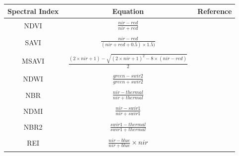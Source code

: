     \renewcommand{\arraystretch}{1.8}
    \begin{center}
    \small
    \begin{tabular}{ccc}
    \label{tab:spectral_indices}
    Spectral Index & Equation & Reference\\
    \hline
    NDVI &
    $\begin{aligned} %
    \frac{nir - red}{nir + red}
    \end{aligned}$ & \citep{tucker1979red}\\
    SAVI &
    $\begin{aligned} %
    \frac{nir - red}{(nir + red + 0.5) \times 1.5)}
    \end{aligned}$ & \citep{huete1988savi}\\
    MSAVI &
    $\begin{aligned} %
    \frac{(2 \times nir + 1) - \sqrt{(2 \times nir + 1)^{2} - 8 \times (nir - red)}}{2}
    \end{aligned}$ &  \citep{qi1994msavi}\\
    NDWI &
    $\begin{aligned} %
    \frac{green - swir2}{green + swir2}
    \end{aligned}$ & \citep{gao1996ndwi}\\
    NBR &
    $\begin{aligned} %
    \frac{nir - thermal}{nir + thermal}
    \end{aligned}$ & \citep{key1999nbr}\\
    NDMI &
    $\begin{aligned} %
    \frac{nir - swir1}{nir + swir1}
    \end{aligned}$ & \citep{jin2005ndmi}\\
    NBR2 &
    $\begin{aligned} %
    \frac{swir1 - thermal}{swir1 + thermal}
    \end{aligned}$ & \citep{key2006nbr2}\\
    REI &
    $\begin{aligned}
    {\frac{nir - blue}{nir + blue}}\times{nir}
    \end{aligned}$ & \citep{shahi2015novel}
    \end{tabular}
    \end{center}
    \renewcommand{\arraystretch}{1}
    

